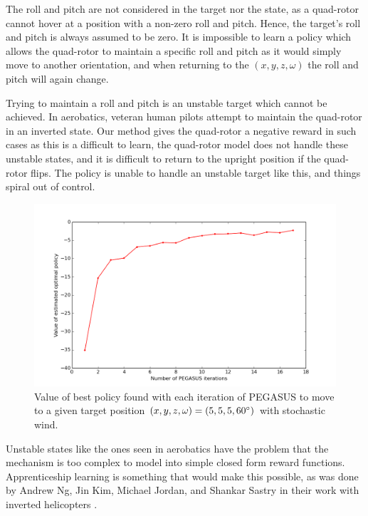 \documentclass[hidelinks,BTech]{iitmdiss}
\begin{document}
The roll and pitch are not considered in the target nor the state, as a quad-rotor cannot hover at a position with a non-zero roll and pitch. Hence, the target's roll and pitch is always assumed to be zero. It is impossible to learn a policy which allows the quad-rotor to maintain a specific roll and pitch as it would simply move to another orientation, and when returning to the $(x, y, z, \omega)$ the roll and pitch will again change.

Trying to maintain a roll and pitch is an unstable target which cannot be achieved. In aerobatics, veteran human pilots attempt to maintain the quad-rotor in an inverted state. Our method gives the quad-rotor a negative reward in such cases as this is a difficult to learn, the quad-rotor model does not handle these unstable states, and it is difficult to return to the upright position if the quad-rotor flips. The policy is unable to handle an unstable target like this, and things spiral out of control.

\begin{figure}[H]
  \centering
    \includegraphics[width=\textwidth]{quadrotor_position_control_time.png}
    \caption{Value of best policy found with each iteration of PEGASUS to move to a given target position $(x, y, z, \omega) = (5, 5, 5, 60\protect^{\circ})$ with stochastic wind.}
\end{figure}

Unstable states like the ones seen in aerobatics have the problem that the mechanism is too complex to model into simple closed form reward functions. Apprenticeship learning is something that would make this possible, as was done by Andrew Ng, Jin Kim, Michael Jordan, and Shankar Sastry in their work with inverted helicopters \cite{InvertedHelicopterFlight}.
\end{document}
